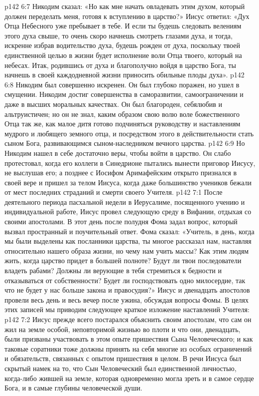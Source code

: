 \vs p142 6:7 Никодим сказал: «Но как мне начать овладевать этим духом, который должен переделать меня, готовя к вступлению в царство?» Иисус ответил: «Дух Отца Небесного уже пребывает в тебе. И если ты будешь следовать велениям этого духа свыше, то очень скоро начнешь смотреть глазами духа, и тогда, искренне избрав водительство духа, будешь рожден от духа, поскольку твоей единственной целью в жизни будет исполнение воли Отца твоего, который на небесах. Итак, родившись от духа и благополучно войдя в царство Бога, ты начнешь в своей каждодневной жизни приносить обильные плоды духа».
\vs p142 6:8 Никодим был совершенно искренен. Он был глубоко поражен, но ушел в смущении. Никодим достиг совершенства в саморазвитии, самоограничении и даже в высших моральных качествах. Он был благороден, себялюбив и альтруистичен; но он не знал, каким образом  свою волю воле божественного Отца так же, как малое дитя готово подчиняться руководству и наставлениям мудрого и любящего земного отца, и посредством этого в действительности стать сыном Бога, развивающимся сыном\hyp{}наследником вечного царства.
\vs p142 6:9 Но Никодим нашел в себе достаточно веры, чтобы войти в царство. Он слабо протестовал, когда его коллеги в Синедрионе пытались вынести приговор Иисусу, не выслушав его; а позднее с Иосифом Аримафейским открыто признался в своей вере и пришел за телом Иисуса, когда даже большинство учеников бежали от мест последних страданий и смерти своего Учителя.
\vs p142 7:1 После деятельного периода пасхальной недели в Иерусалиме, посященного учению и индивидуальной работе, Иисус провел следующую среду в Вифании, отдыхая со своими апостолами. В этот день после полудня Фома задал вопрос, который вызвал пространный и поучительный ответ. Фома сказал: «Учитель, в день, когда мы были выделены как посланники царства, ты многое рассказал нам, наставляя относительно нашего образа жизни, но чему нам учить массы? Как этим людям жить, когда царство придет в большей полноте? Будут ли твои последователи владеть рабами? Должны ли верующие в тебя стремиться к бедности и отказываться от собственности? Будет ли господствовать одно милосердие, так что не будет у нас больше закона и правосудия?» Иисус и двенадцать апостолов провели весь день и весь вечер после ужина, обсуждая вопросы Фомы. В целях этих записей мы приводим следующее краткое изложение наставлений Учителя:
\vs p142 7:2 Иисус прежде всего постарался объяснить своим апостолам, что сам он жил на земле особой, неповторимой жизнью во плоти и что они, двенадцать, были призваны участвовать в этом опыте пришествия Сына Человеческого; и как таковые соратники тоже должны принять на себя многие из особых ограничений и обязательств, связанных с опытом пришествия в целом. В речи Иисуса был скрытый намек на то, что Сын Человеческий был единственной личностью, когда\hyp{}либо жившей на земле, которая одновременно могла зреть и в самое сердце Бога, и в самые глубины человеческой души.
